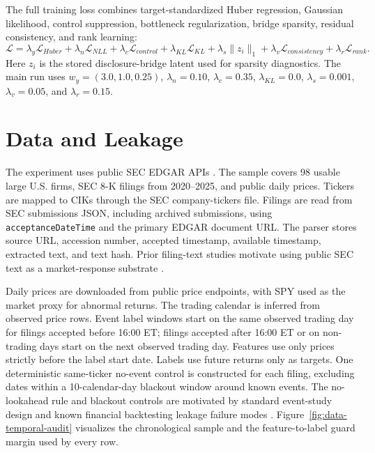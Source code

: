 \documentclass[10pt,letterpaper]{article}
\begin{document}
The full training loss combines target-standardized Huber regression, Gaussian likelihood, control
suppression, bottleneck regularization, bridge sparsity, residual consistency, and rank learning:
\begin{equation}
\mathcal{L} =
\lambda_y\mathcal{L}_{Huber}
+\lambda_n\mathcal{L}_{NLL}
+\lambda_c\mathcal{L}_{control}
+\lambda_{KL}\mathcal{L}_{KL}
+\lambda_s\lVert z_i\rVert_1
+\lambda_v\mathcal{L}_{consistency}
+\lambda_r\mathcal{L}_{rank}.
\end{equation}
Here \(z_i\) is the stored disclosure-bridge latent used for sparsity diagnostics. The main run
uses \(w_y=(3.0,1.0,0.25)\), \(\lambda_n=0.10\), \(\lambda_c=0.35\),
\(\lambda_{KL}=0.0\), \(\lambda_s=0.001\), \(\lambda_v=0.05\), and \(\lambda_r=0.15\).

\section{Data and Leakage}

The experiment uses public SEC EDGAR APIs \citep{secapi}. The sample covers 98 usable large U.S.
firms, SEC 8-K filings from 2020--2025, and public daily prices. Tickers are mapped to CIKs through
the SEC company-tickers file. Filings are read from SEC submissions JSON, including archived
submissions, using \texttt{acceptanceDateTime} and the primary EDGAR document URL. The parser stores
source URL, accession number, accepted timestamp, available timestamp, extracted text, and text
hash. Prior filing-text studies motivate using public SEC text as a market-response substrate
\citep{loughran2011liability,jegadeesh2013word,cohen2020lazy}.

Daily prices are downloaded from public price endpoints, with SPY used as the market proxy for
abnormal returns. The trading calendar is inferred from observed price rows. Event label windows
start on the same observed trading day for filings accepted before 16:00 ET; filings accepted after
16:00 ET or on non-trading days start on the next observed trading day. Features use only prices
strictly before the label start date. Labels use future returns only as targets. One deterministic
same-ticker no-event control is constructed for each filing, excluding dates within a 10-calendar-day
blackout window around known events. The no-lookahead rule and blackout controls are motivated by
standard event-study design and known financial backtesting leakage failure modes
\citep{mackinlay1997eventstudies,white2000reality,hansen2005spa,bailey2014probability,
lopezdeprado2018advances,li2025profitmirage}. Figure~\ref{fig:data-temporal-audit} visualizes
the chronological sample and the feature-to-label guard margin used by every row.
\end{document}
